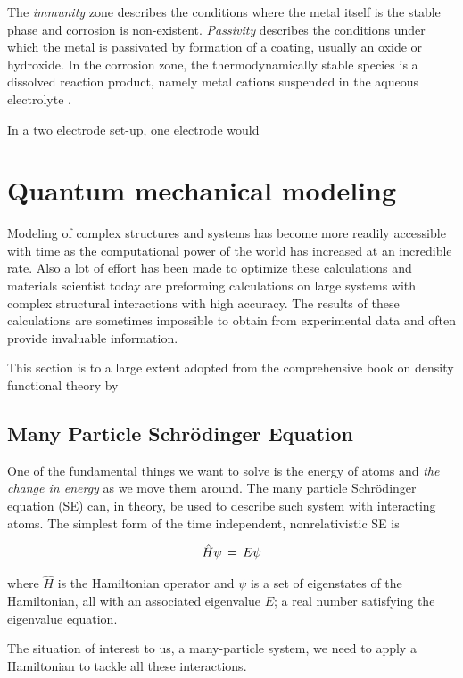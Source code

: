 {{The \textit{immunity} zone describes the conditions where the metal itself is the stable phase and corrosion is non-existent. \textit{Passivity} describes the conditions under which the metal is passivated by formation of a coating, usually an oxide or hydroxide. In the corrosion zone, the thermodynamically stable species is a dissolved reaction product, namely metal cations suspended in the aqueous electrolyte \citep{Beverskog1995}.

In a two electrode set-up, one electrode would 


}
\newpage
\section{Quantum mechanical modeling}

Modeling of complex structures and systems has become more readily accessible with time as the computational power of the world has increased at an incredible rate. Also a lot of effort has been made to optimize these calculations and materials scientist today are preforming calculations on large systems with complex structural interactions with high accuracy. The results of these calculations are sometimes impossible to obtain from experimental data and often provide invaluable information. 

This section is to a large extent adopted from the comprehensive book on density functional theory by \citet{Sholl2009}

\subsection{Many Particle Schrödinger Equation}

One of the fundamental things we want to solve is the energy of atoms and \textit{the change in energy} as we move them around. The many particle Schrödinger equation (SE) can, in theory, be used to describe such system with interacting atoms. The simplest form of the time independent, nonrelativistic SE is

\begin{align}
\hat{H}\psi\,=\, E\psi
	\label{eq:schrödinger_simple}
\end{align}

where $\hat{H}$ is the Hamiltonian operator and $\psi$ is a set of eigenstates of the Hamiltonian, all with an associated eigenvalue $E$; a real number satisfying the eigenvalue equation.

The situation of interest to us, a many-particle system, we need to apply a Hamiltonian to tackle all these interactions.

}

